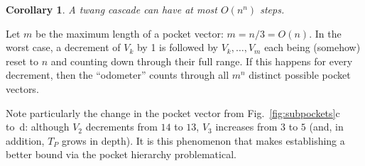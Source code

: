 \pdfoutput=1  \documentclass{article}
\newtheorem{corollary}[theorem]{Corollary}
\newcommand{\corlab}[1]{\label{cor:#1}}
\newcommand{\figref}[1]{\ref{fig:#1}}
\newcommand{\ABox}{
\raisebox{3pt}{\framebox[6pt]{\rule{6pt}{0pt}}}
}
\newenvironment{pf}{{\bf Proof:}}{\hfill\ABox}
\begin{document}
\begin{corollary}
A twang cascade can have at most $O(n^n)$ steps.
\corlab{odometer}
\end{corollary}
\begin{pf}
Let $m$ be the maximum length of a pocket vector:
$m=n/3 = O(n)$.
In the worst case, a decrement of $V_k$ by 1 is followed
by $V_k,\ldots,V_m$ each being (somehow) reset to $n$ and counting down
through their full range.
If this happens for every decrement, then
the ``odometer'' counts through all $m^n$ distinct possible pocket vectors.
\end{pf}

Note particularly the change in the pocket vector from 
Fig.~\figref{subpockets}c to~d: although $V_2$ decrements
from $14$ to $13$, $V_3$ increases from $3$ to $5$
(and, in addition, $T_P$ grows in depth).
It is this phenomenon that makes establishing a better bound
via the pocket hierarchy problematical.
\end{document}
